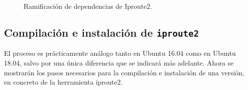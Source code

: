 \begin{figure}
\centering
{}
\caption{Ramificación de dependencias de Iproute2.}
\label{fig:DependenciasIproute}
\end{figure}

\newpage

\subsection{Compilación e instalación de \texttt{iproute2}}
El proceso es prácticamente análogo tanto en Ubuntu 16.04 como en Ubuntu 18.04, salvo por una única diferencia que se indicará más adelante. Ahora se mostrarán los pasos necesarios para la compilación e instalación de una versión, en concreto de la herramienta iproute2.

